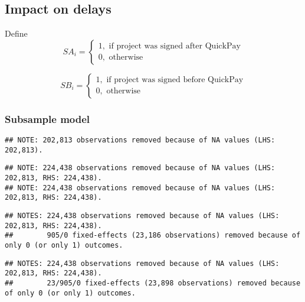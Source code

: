\documentclass[
]{article}
\begin{document}
\hypertarget{impact-on-delays}{%
\subsection{Impact on delays}\label{impact-on-delays}}

Define
\[ SA_i = \begin{cases} 1, \text{ if project was signed after QuickPay}\\
0, \text{ otherwise} \end{cases}\]

\[ SB_i = \begin{cases} 1, \text{ if project was signed before QuickPay}\\
0, \text{ otherwise} \end{cases}\]

\hypertarget{subsample-model}{%
\subsubsection{Subsample model}\label{subsample-model}}

\begin{verbatim}
## NOTE: 202,813 observations removed because of NA values (LHS: 202,813).
\end{verbatim}

\begin{verbatim}
## NOTE: 224,438 observations removed because of NA values (LHS: 202,813, RHS: 224,438).
## NOTE: 224,438 observations removed because of NA values (LHS: 202,813, RHS: 224,438).
\end{verbatim}

\begin{verbatim}
## NOTES: 224,438 observations removed because of NA values (LHS: 202,813, RHS: 224,438).
##        905/0 fixed-effects (23,186 observations) removed because of only 0 (or only 1) outcomes.
\end{verbatim}

\begin{verbatim}
## NOTES: 224,438 observations removed because of NA values (LHS: 202,813, RHS: 224,438).
##        23/905/0 fixed-effects (23,898 observations) removed because of only 0 (or only 1) outcomes.
\end{verbatim}
\end{document}
